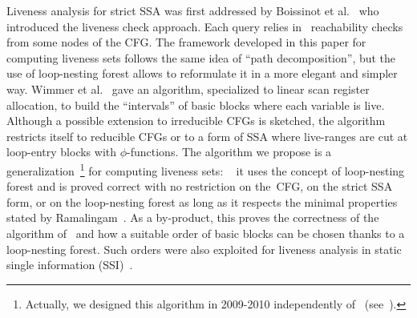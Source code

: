 Liveness analysis for strict SSA was first addressed by Boissinot et
al.~\cite{BoissinotHGDR08} who introduced the liveness check approach.
Each query relies in \reduced\ reachability checks from some nodes of the CFG.
The framework developed in this paper for computing liveness sets follows the same idea of ``path decomposition'', but the use of loop-nesting forest allows to reformulate it in a more elegant and simpler way.
Wimmer et al.~\cite{WimmerF10} gave an algorithm, specialized to linear scan
register allocation, to build the ``intervals'' of basic blocks where each
variable is live. Although a possible extension to irreducible CFGs is
sketched, the algorithm restricts itself to reducible CFGs or to a form of SSA
where live-ranges are cut at loop-entry blocks with $\phi$-functions.  The algorithm
we propose is a generalization~\footnote{Actually, we designed this algorithm
  in 2009-2010 independently of~\cite{WimmerF10} (see~\cite{Boissinot10}).} for computing liveness sets: ~\cite{BoissinotHGDR08}
it uses the concept of loop-nesting forest and is proved correct with no
restriction on the~CFG, on the strict SSA form, or on the loop-nesting forest
as long as it respects the minimal properties stated by
Ramalingam~\cite{ramalingam:2002:loopforest:minimal}. As a by-product, this
proves the correctness of the algorithm of~\cite{WimmerF10} and how a suitable
order of basic blocks can be chosen thanks to a loop-nesting forest. Such
orders were also exploited for liveness analysis in static single information
(SSI)~\cite{BoissinotBDR12}.  
